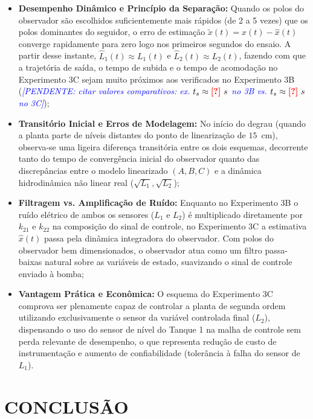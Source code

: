 \documentclass[a4paper,12pt]{article}
\newcommand{\dado}[1]{\textcolor{red}{\textbf{[#1]}}}
\newcommand{\pendente}[1]{\textcolor{blue}{\textit{[PENDENTE: #1]}}}
\newcommand{\dado}[1]{#1}
\newcommand{\pendente}[1]{}
\begin{document}
\begin{itemize}
    \item \textbf{Desempenho Dinâmico e Princípio da Separação:} Quando os polos do observador são escolhidos suficientemente mais rápidos (de 2 a 5 vezes) que os polos dominantes do seguidor, o erro de estimação $\tilde{x}(t) = x(t) - \hat{x}(t)$ converge rapidamente para zero logo nos primeiros segundos do ensaio. A partir desse instante, $\hat{L}_1(t) \approx L_1(t)$ e $\hat{L}_2(t) \approx L_2(t)$, fazendo com que a trajetória de saída, o tempo de subida e o tempo de acomodação no Experimento 3C sejam muito próximos aos verificados no Experimento 3B (\pendente{citar valores comparativos: ex. $t_s \approx \dado{?}~s$ no 3B vs. $t_s \approx \dado{?}~s$ no 3C});
    \item \textbf{Transitório Inicial e Erros de Modelagem:} No início do degrau (quando a planta parte de níveis distantes do ponto de linearização de $15$~cm), observa-se uma ligeira diferença transitória entre os dois esquemas, decorrente tanto do tempo de convergência inicial do observador quanto das discrepâncias entre o modelo linearizado $(A, B, C)$ e a dinâmica hidrodinâmica não linear real ($\sqrt{L_1}, \sqrt{L_2}$);
    \item \textbf{Filtragem vs. Amplificação de Ruído:} Enquanto no Experimento 3B o ruído elétrico de ambos os sensores ($L_1$ e $L_2$) é multiplicado diretamente por $k_{21}$ e $k_{22}$ na composição do sinal de controle, no Experimento 3C a estimativa $\hat{x}(t)$ passa pela dinâmica integradora do observador. Com polos do observador bem dimensionados, o observador atua como um filtro passa-baixas natural sobre as variáveis de estado, suavizando o sinal de controle enviado à bomba;
    \item \textbf{Vantagem Prática e Econômica:} O esquema do Experimento 3C comprova ser plenamente capaz de controlar a planta de segunda ordem utilizando exclusivamente o sensor da variável controlada final ($L_2$), dispensando o uso do sensor de nível do Tanque 1 na malha de controle sem perda relevante de desempenho, o que representa redução de custo de instrumentação e aumento de confiabilidade (tolerância à falha do sensor de $L_1$).
\end{itemize}

\newpage


\thispagestyle{main}

\section{CONCLUSÃO}
\end{document}
